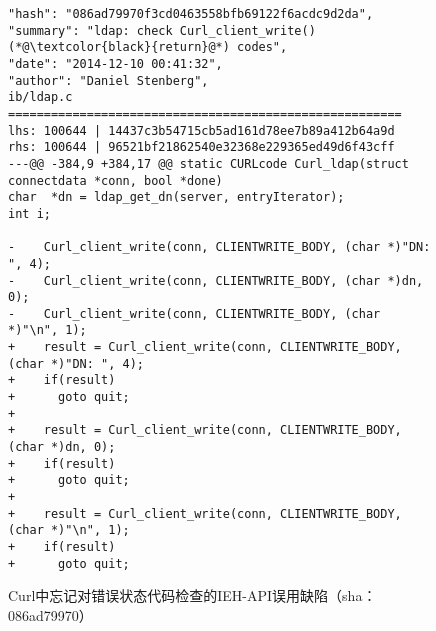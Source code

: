 \begin{figure}[t]
	\centering
\begin{lstlisting}
"hash": "086ad79970f3cd0463558bfb69122f6acdc9d2da",
"summary": "ldap: check Curl_client_write() (*@\textcolor{black}{return}@*) codes",
"date": "2014-12-10 00:41:32",
"author": "Daniel Stenberg",
ib/ldap.c
=======================================================
lhs: 100644 | 14437c3b54715cb5ad161d78ee7b89a412b64a9d
rhs: 100644 | 96521bf21862540e32368e229365ed49d6f43cff
---@@ -384,9 +384,17 @@ static CURLcode Curl_ldap(struct connectdata *conn, bool *done)
char  *dn = ldap_get_dn(server, entryIterator);
int i;

-    Curl_client_write(conn, CLIENTWRITE_BODY, (char *)"DN: ", 4);
-    Curl_client_write(conn, CLIENTWRITE_BODY, (char *)dn, 0);
-    Curl_client_write(conn, CLIENTWRITE_BODY, (char *)"\n", 1);
+    result = Curl_client_write(conn, CLIENTWRITE_BODY, (char *)"DN: ", 4);
+    if(result)
+      goto quit;
+
+    result = Curl_client_write(conn, CLIENTWRITE_BODY, (char *)dn, 0);
+    if(result)
+      goto quit;
+
+    result = Curl_client_write(conn, CLIENTWRITE_BODY, (char *)"\n", 1);
+    if(result)
+      goto quit;

\end{lstlisting}
	\caption{
	Curl中忘记对错误状态代码检查的IEH-API误用缺陷（sha：086ad79970）
	}
	\label{fig:2-3-ieh-1}
\end{figure}